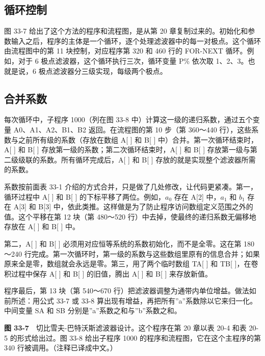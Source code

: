\subsection{循环控制}

图 33-7 给出了这个方法的程序和流程图，是从第 20
章复制过来的。初始化和参数输入之后，程序的主体是一个循环，逐个处理滤波器中的每一对极点。这个循环由流程图中的第
11 块控制，对应程序第 320 和 460 行的 FOR-NEXT 循环。例如，对于 6
极点滤波器，这个循环执行三次，循环变量 P\% 依次取 1、2、3。也就是说，6
极点滤波器分三级实现，每级两个极点。

\subsection{合并系数}

每次循环中，子程序 1000（列在图 33-8
中）计算这一级的递归系数，通过五个变量 A0、A1、A2、B1、B2
返回。在流程图的第 10 步（第 360～440
行），这些系数与之前所有级的系数（存放在数组 A{[} {]} 和 B{[} {]}
中）合并。第一次循环结束时，A{[} {]} 和 B{[} {]}
存放第一级的系数；第二次循环结束时，A{[} {]} 和 B{[} {]}
存放第一级与第二级级联的系数。所有循环完成后，A{[} {]} 和 B{[} {]}
存放的就是实现整个滤波器所需的系数。

系数按前面表 33-1
介绍的方式合并，只是做了几处修改，让代码更紧凑。第一，循环过程中 A{[}
{]} 和 B{[} {]} 的下标平移了两位。例如，\(a_0\) 存在 A{[}2{]}
中，\(a_1\) 和 \(b_1\) 存在 A{[}3{]} 和 B{[}3{]}
中，依此类推。这样做是为了防止程序访问数组定义范围之外的值。这个平移在第
12 块（第 480～520 行）中去掉，使最终的递归系数无偏移地存放在 A{[} {]}
和 B{[} {]} 中。

第二，A{[} {]} 和 B{[} {]}
必须用对应恒等系统的系数初始化，而不是全零。这在第 180～240
行完成。第一次循环时，第一级的系数与这些数组里原有的信息合并；如果原来全是零，数组就会永远是零。第三，用了两个临时数组
TA{[} {]} 和 TB{[} {]}，在卷积过程中保存 A{[} {]} 和 B{[} {]}
的旧值，腾出 A{[} {]} 和 B{[} {]} 来存放新值。

程序最后，第 13 块（第 540～670
行）把滤波器调整为通带内单位增益。做法如前所述：用公式 33-7 或 33-8
算出现有增益，再把所有''a''系数除以它来归一化。中间变量 SA 和 SB
分别是''a''系数之和与''b''系数之和。

\textbf{图 33-7}　切比雪夫-巴特沃斯滤波器设计。这个程序在第 20 章以表
20-4 和表 20-5 的形式给出过。图 33-8 给出子程序 1000
的程序和流程图，它在这个主程序的第 340 行被调用。（注释已译成中文。）

